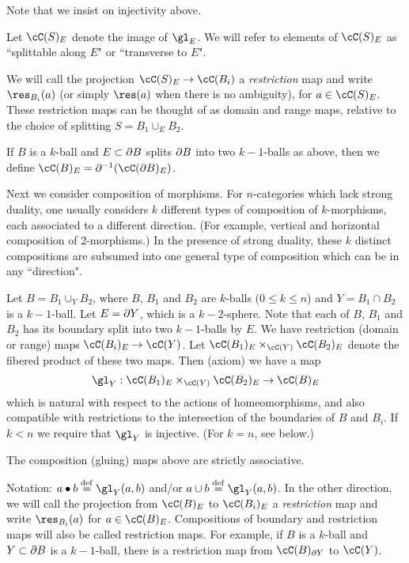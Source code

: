 Note that we insist on injectivity above.

Let $\cC(S)_E$ denote the image of $\gl_E$.
We will refer to elements of $\cC(S)_E$ as ``splittable along $E$" or ``transverse to $E$". 

We will call the projection $\cC(S)_E \to \cC(B_i)$
a {\it restriction} map and write $\res_{B_i}(a)$
(or simply $\res(a)$ when there is no ambiguity), for $a\in \cC(S)_E$.
These restriction maps can be thought of as
domain and range maps, relative to the choice of splitting $S = B_1 \cup_E B_2$.

If $B$ is a $k$-ball and $E \subset \partial B$ splits $\partial B$ into two $k{-}1$-balls
as above, then we define $\cC(B)_E = \bd^{-1}(\cC(\bd B)_E)$.

Next we consider composition of morphisms.
For $n$-categories which lack strong duality, one usually considers
$k$ different types of composition of $k$-morphisms, each associated to a different direction.
(For example, vertical and horizontal composition of 2-morphisms.)
In the presence of strong duality, these $k$ distinct compositions are subsumed into 
one general type of composition which can be in any ``direction".

{Let $B = B_1 \cup_Y B_2$, where $B$, $B_1$ and $B_2$ are $k$-balls ($0\le k\le n$)
and $Y = B_1\cap B_2$ is a $k{-}1$-ball.
Let $E = \partial Y$, which is a $k{-}2$-sphere.
Note that each of $B$, $B_1$ and $B_2$ has its boundary split into two $k{-}1$-balls by $E$.
We have restriction (domain or range) maps $\cC(B_i)_E \to \cC(Y)$.
Let $\cC(B_1)_E \times_{\cC(Y)} \cC(B_2)_E$ denote the fibered product of these two maps. 
Then (axiom) we have a map
\[
	\gl_Y : \cC(B_1)_E \times_{\cC(Y)} \cC(B_2)_E \to \cC(B)_E
\]
which is natural with respect to the actions of homeomorphisms, and also compatible with restrictions
to the intersection of the boundaries of $B$ and $B_i$.
If $k < n$ we require that $\gl_Y$ is injective.
(For $k=n$, see below.)}

{The composition (gluing) maps above are strictly associative.}

Notation: $a\bullet b \deq \gl_Y(a, b)$ and/or $a\cup b \deq \gl_Y(a, b)$.
In the other direction, we will call the projection from $\cC(B)_E$ to $\cC(B_i)_E$ 
a {\it restriction} map and write $\res_{B_i}(a)$ for $a\in \cC(B)_E$.
Compositions of boundary and restriction maps will also be called restriction maps.
For example, if $B$ is a $k$-ball and $Y\subset \partial B$ is a $k{-}1$-ball, there is a
restriction map from $\cC(B)_{\bd Y}$ to $\cC(Y)$.

